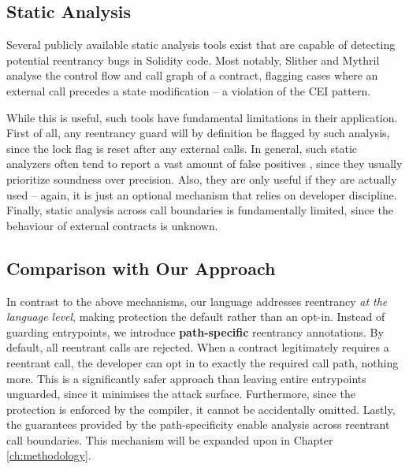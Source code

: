 \subsection{Static Analysis}
Several publicly available static analysis tools exist that are capable of detecting potential reentrancy bugs in Solidity code. Most notably, Slither \cite{slither} and Mythril \cite{mythril} analyse the control flow and call graph of a contract, flagging cases where an external call precedes a state modification -- a violation of the CEI pattern.
\par
While this is useful, such tools have fundamental limitations in their application. First of all, any reentrancy guard will by definition be flagged by such analysis, since the lock flag is reset after any external calls. In general, such static analyzers often tend to report a vast amount of false positives \cite{how-effective-analysis-tools}, since they usually prioritize soundness over precision. Also, they are only useful if they are actually used -- again, it is just an optional mechanism that relies on developer discipline. Finally, static analysis across call boundaries is fundamentally limited, since the behaviour of external contracts is unknown.

\subsection{Comparison with Our Approach}
In contrast to the above mechanisms, our language addresses reentrancy \textit{at the language level}, making protection the default rather than an opt-in. Instead of guarding entrypoints, we introduce \textbf{path-specific} reentrancy annotations. By default, all reentrant calls are rejected. When a contract legitimately requires a reentrant call, the developer can opt in to exactly the required call path, nothing more. This is a significantly safer approach than leaving entire entrypoints unguarded, since it minimises the attack surface. Furthermore, since the protection is enforced by the compiler, it cannot be accidentally omitted. Lastly, the guarantees provided by the path-specificity enable analysis across reentrant call boundaries. This mechanism will be expanded upon in Chapter \ref{ch:methodology}.
